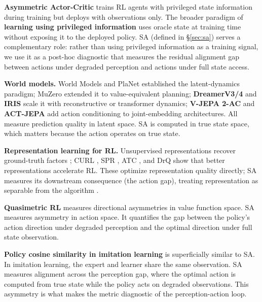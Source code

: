\documentclass{article}
\begin{document}
\textbf{Asymmetric Actor-Critic} \citep{pinto2018asymmetric} trains RL agents
with privileged state information during training but deploys with observations
only. The broader paradigm of \textbf{learning using privileged information}
\citep{vapnik2009lupi} uses oracle state at training time without exposing it
to the deployed policy. SA (defined in \S\ref{sec:sa}) serves a complementary
role: rather than using privileged information as a training signal, we use it
as a post-hoc diagnostic that measures the residual alignment gap between
actions under degraded perception and actions under full state access.

\textbf{World models.} World Models \citep{ha2018world} and PlaNet
\citep{hafner2019planet} established the latent-dynamics paradigm; MuZero
\citep{schrittwieser2020muzero} extended it to value-equivalent planning;
\textbf{DreamerV3/4} \citep{hafner2023mastering, hafner2025dreamer4} and
\textbf{IRIS} \citep{micheli2023transformers} scale it with reconstructive or
transformer dynamics; \textbf{V-JEPA 2-AC} \citep{vjepa2_2025} and
\textbf{ACT-JEPA} \citep{actjepa2025} add action conditioning to joint-embedding
architectures. All measure prediction quality in latent space. SA is computed
in true state space, which matters because the action operates on true state.

\textbf{Representation learning for RL.} Unsupervised representations recover
ground-truth factors \citep{anand2019unsupervised}; CURL \citep{laskin2020curl},
SPR \citep{schwarzer2021data}, ATC \citep{stooke2021decoupling}, and DrQ
\citep{yarats2021image} show that better representations accelerate RL. These
optimize representation quality directly; SA measures its downstream
consequence (the action gap), treating representation as separable from the
algorithm \citep{bengio2013representation}.

\textbf{Quasimetric RL} \citep{wang2023quasimetric} measures directional
asymmetries in value function space. SA measures asymmetry in action space.
It quantifies the gap between the policy's action direction under degraded
perception and the optimal direction under full state observation.

\textbf{Policy cosine similarity in imitation learning} is superficially similar
to SA. In imitation learning, the expert and learner share the same observation.
SA measures alignment across the perception gap, where the optimal action is
computed from true state while the policy acts on degraded observations. This
asymmetry is what makes the metric diagnostic of the perception-action loop.
\end{document}
